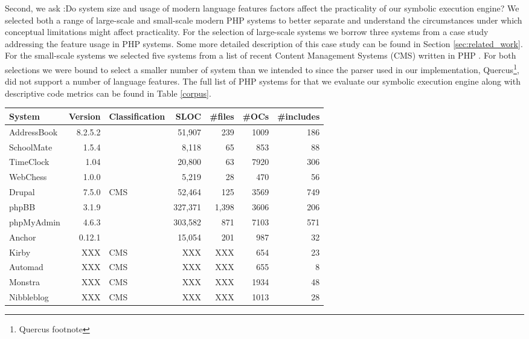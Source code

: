 \documentclass[sigconf]{acmart}
\renewcommand{\sf}[1]{\textsf{#1}}
\begin{document}
Second, we ask :Do system size and usage of modern language features
factors affect the practicality of our symbolic execution engine? We
selected both a range of large-scale and small-scale modern PHP systems to
better separate and understand the circumstances under which conceptual
limitations might affect practicality. For the selection of large-scale systems
we borrow three systems from a case study addressing the feature usage in PHP
systems. Some more detailed description of this case study can be found in
Section \ref{sec:related_work}. For the small-scale systems we selected five systems from
a list of recent Content Management Systems (CMS) written in PHP \cite{codegeekz}. For both
selections we were bound to select a smaller number of system than we intended
to since the parser used in our implementation, \sf{Quercus}\footnote{Quercus
footnote}, did not support a number of language features. The full list of PHP
systems for that we evaluate our symbolic execution engine along with
descriptive code metrics can be found in Table \ref{corpus}.

\begin{table*}[t]
\centering 
	\begin{tabular}{lrp{4cm}rrrr}
	\toprule
	\textbf{System} & \textbf{Version} & \textbf{Classification} & \textbf{SLOC} &
	\textbf{\#files} & \textbf{\#OCs} & \textbf{\#includes}\\
	\midrule
	AddressBook & 8.2.5.2 &  & 51,907 & 239  & 1009 & 186\\
	SchoolMate & 1.5.4 &  & 8,118 & 65  & 853 & 88\\
	TimeClock & 1.04 &  & 20,800 & 63  & 7920 & 306\\
	WebChess & 1.0.0 &  & 5,219 & 28  & 470 & 56\\
	\midrule
	Drupal & 7.5.0 & CMS & 52,464 & 125  & 3569 & 749\\
	phpBB & 3.1.9 &  & 327,371 & 1,398  & 3606 & 206\\
	phpMyAdmin & 4.6.3 &  & 303,582 & 871  & 7103 & 571\\
	\midrule
	Anchor & 0.12.1 &  & 15,054 & 201 & 987 & 32\\
	Kirby & XXX & CMS & XXX & XXX  & 654 & 23\\
	Automad & XXX & CMS & XXX & XXX  & 655 & 8\\
	Monstra & XXX & CMS & XXX & XXX  & 1934 & 48\\
	Nibbleblog & XXX & CMS & XXX & XXX  & 1013 & 28\\
	\bottomrule
	\end{tabular}
	\caption{Corpus of twelve PHP systems. The file count includes files with a .php,
	.inc, .bit or .module extension.}
	\label{corpus}
\end{table*}
\end{document}
